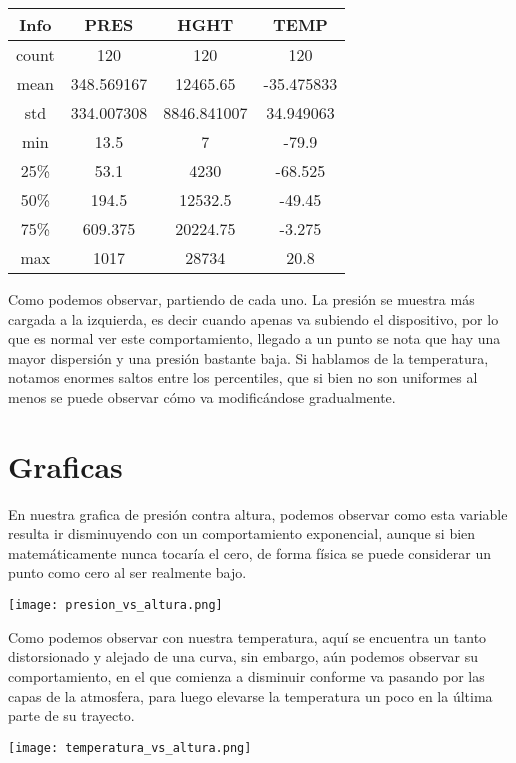 \documentclass[a4paper,12pt]{article}
\begin{document}
\begin{center}
\begin{tabular}{|c|c|c|c|}
\hline
Info & PRES & HGHT & TEMP \\ \hline
count&	120&	120&	120\\ \hline
mean&	348.569167&	12465.65&	-35.475833\\ \hline
std	&334.007308&	8846.841007&	34.949063\\ \hline
min&	13.5&	7&	-79.9\\ \hline
25\% &	53.1&	4230&	-68.525\\ \hline
50\% &	194.5 &	12532.5&	-49.45\\ \hline
75\% &	609.375 &	20224.75&	-3.275\\ \hline
max	& 1017&	28734&	20.8\\ \hline
\end{tabular}
\end{center}

\noindent
Como podemos observar, partiendo de cada uno. La presión se muestra más cargada a la izquierda, es decir cuando apenas va subiendo el dispositivo, por lo que es normal ver este comportamiento, llegado a un punto se nota que hay una mayor dispersión y una presión bastante baja. Si hablamos de la temperatura, notamos enormes saltos entre los percentiles, que si bien no son uniformes al menos se puede observar cómo va modificándose gradualmente.

\newpage
\section{Graficas}
\noindent
En nuestra grafica de presión contra altura, podemos observar como esta variable resulta ir disminuyendo con un comportamiento exponencial, aunque si bien matemáticamente nunca tocaría el cero, de forma física se puede considerar un punto como cero al ser realmente bajo.

\begin{center}
\texttt{[image: presion\_vs\_altura.png]}
\end{center}

\noindent
Como podemos observar con nuestra temperatura, aquí se encuentra un tanto distorsionado y alejado de una curva, sin embargo, aún podemos observar su comportamiento, en el que comienza a disminuir conforme va pasando por las capas de la atmosfera, para luego elevarse la temperatura un poco en la última parte de su trayecto.
\begin{center}
\texttt{[image: temperatura\_vs\_altura.png]}
\end{center}
\end{document}
